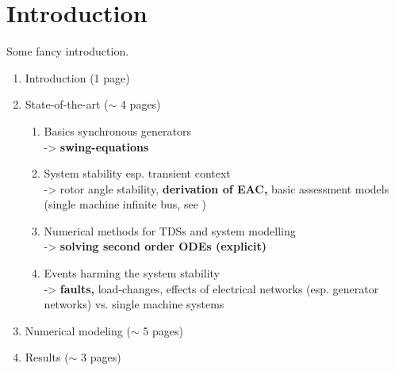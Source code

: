 
\chapter{Introduction}
\label{chap:intro}

Some fancy introduction.

\begin{enumerate}\bfseries \singlespacing \small
    \renewcommand{\labelenumi}{\theenumi}
    \renewcommand{\theenumi}{\arabic{enumi}}
    \renewcommand{\labelenumii}{\theenumii}
    \renewcommand{\theenumii}{\theenumi.\arabic{enumii}}
    \setlength{\leftmarginii}{5.4ex}
    \item Introduction (1 page)
    \item State-of-the-art ($\sim$ 4 pages)
    \begin{enumerate} \mdseries
        \item Basics synchronous generators \\
        -> \textbf{swing-equations}
        \item System stability esp. transient context \\
        -> rotor angle stability, \textbf{derivation of EAC,} basic assessment models (single machine infinite bus, see \autocite{kundurPowerSystemStability2022})
        \item Numerical methods for \acsp{TDS} and system modelling \\
        -> \textbf{solving second order ODEs (explicit)}
        \item Events harming the system stability \\
        -> \textbf{faults,} load-changes, effects of electrical networks (esp. generator networks) vs. single machine systems
    \end{enumerate}
    \item Numerical modeling ($\sim$ 5 pages)
    \item Results ($\sim$ 3 pages)
    \begin{enumerate} \mdseries

\end{enumerate}
\end{enumerate}
